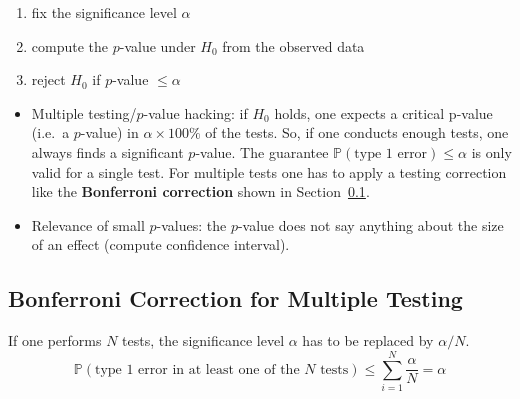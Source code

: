 \newpar{}
\begin{enumerate}
    \item fix the significance level $\alpha$
    \item compute the $p$-value under $H_0$ from the observed data
    \item reject $H_0$ if $p$-value $\leq \alpha$
\end{enumerate}

\newpar{}

\begin{itemize}
    \item Multiple testing/$p$-value hacking: if $H_0$ holds, one expects a critical p-value (i.e.\ a $p$-value) in $\alpha \times 100\%$ of the tests. So, if one conducts enough tests, one always finds a significant $p$-value. The guarantee $\mathbb{P}(\text{type 1 error}) \leq \alpha$ is only valid for a single test. For multiple tests one has to apply a testing correction like the \textbf{Bonferroni correction} shown in Section~\ref{bonferroni_correction}.
    \item Relevance of small $p$-values: the $p$-value does not say anything about the size of an effect (compute confidence interval).
\end{itemize}


\subsection{Bonferroni Correction for Multiple Testing}\label{bonferroni_correction}
If one performs $N$ tests, the significance level $\alpha$ has to be replaced by $\alpha/N$.
\begin{equation*}
    \mathbb{P}(\text{type 1 error in at least one of the }N\text{ tests}) \leq \sum_{i=1}^{N}\frac{\alpha}{N}=\alpha
\end{equation*}

